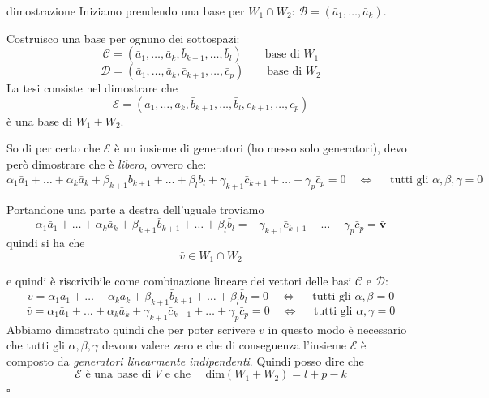 \documentclass[x11names]{article}
\newcommand*{\QEDB}{\null\nobreak\hfill\ensuremath{\square}}%
\begin{document}
\begin{es}{dimostrazione}
	Iniziamo prendendo una base per $W_{1} \cap W_{2}$: $\mathcal{B} = \left(\bar{a}_{1},\dots,\bar{a}_{k}\right)$.
	
	Costruisco una base per ognuno dei sottospazi:
	\[
	\mathcal{C} = \left(\bar{a}_{1},\dots,\bar{a}_{k},\bar{b}_{k+1},\dots,\bar{b}_{l}\right) \qquad \text{base di } W_{1}
	\]
	\[
	\mathcal{D} = \left(\bar{a}_{1},\dots,\bar{a}_{k},\bar{c}_{k+1},\dots,\bar{c}_{p}\right) \qquad \text{base di } W_{2}
	\]
	La tesi consiste nel dimostrare che 
	\[
	\mathcal{E} = \left(\bar{a}_{1},\dots,\bar{a}_{k},\bar{b}_{k+1},\dots,\bar{b}_{l},\bar{c}_{k+1},\dots,\bar{c}_{p}\right)
	\]
	è una base di $W_{1} + W_{2}$.
	
	So di per certo che $\mathcal{E}$ è un insieme di generatori (ho messo solo generatori), devo però dimostrare che è \textit{libero}, ovvero che:
	\[
		\alpha_{1} \bar{a}_{1} + \dots + \alpha_{k} \bar{a}_{k} + \beta_{k+1} \bar{b}_{k+1} + \dots + \beta_{l} \bar{b}_{l} + \gamma_{k+1} \bar{c}_{k+1} + \dots + \gamma_{p} \bar{c}_{p} = 0 \quad \Longleftrightarrow \quad \text{ tutti gli }\alpha, \beta, \gamma = 0
	\]
	
	Portandone una parte a destra dell'uguale troviamo
	\[
	\alpha_{1} \bar{a}_{1} + \dots + \alpha_{k} \bar{a}_{k} + \beta_{k+1} \bar{b}_{k+1} + \dots + \beta_{l} \bar{b}_{l}  = -\gamma_{k+1} \bar{c}_{k+1} - \dots - \gamma_{p} \bar{c}_{p}  \mathbf{= \bar{v}} 
	\]
	quindi si ha che 
	\[
	\bar{v} \in W_{1} \cap W_{2}
	\]
\end{es}
\begin{es}{}
	e quindi è riscrivibile come combinazione lineare dei vettori delle basi $\mathcal{C}$ e $\mathcal{D}$:
	\[
	\bar{v} = 	\alpha_{1} \bar{a}_{1} + \dots + \alpha_{k} \bar{a}_{k} + \beta_{k+1} \bar{b}_{k+1} + \dots + \beta_{l} \bar{b}_{l} = 0\quad \Longleftrightarrow \quad \text{ tutti gli }\alpha, \beta = 0
	\]
	\[
	\bar{v} = 	\alpha_{1} \bar{a}_{1} + \dots + \alpha_{k} \bar{a}_{k} + \gamma_{k+1} \bar{c}_{k+1} + \dots + \gamma_{p} \bar{c}_{p} = 0\quad \Longleftrightarrow \quad \text{ tutti gli }\alpha, \gamma = 0
	\]
	Abbiamo dimostrato quindi che per poter scrivere $\bar{v}$ in questo modo è necessario che tutti gli $\alpha,\beta,\gamma$ devono valere zero e che di conseguenza l'insieme $\mathcal{E}$ è composto da \textit{generatori linearmente indipendenti}. Quindi posso dire che 
	\[
	\mathcal{E} \text{ è una base di } V \text{ e che } \quad \text{dim}(W_{1} + W_{2}) = l + p - k
	\]
	 \QEDB
\end{es}
\end{document}
